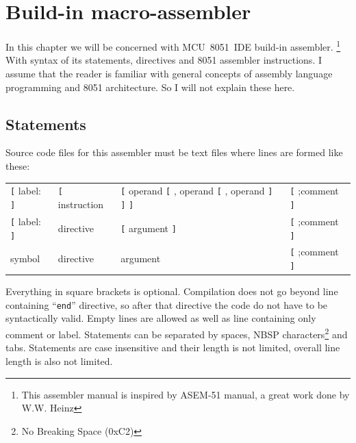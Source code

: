 \documentclass[a4paper,twoside,12pt]{book}
\newcommand{\mysmallfont}{\fontsize{8pt}{10pt} \selectfont{}}
\begin{document}
\chapter{Build-in macro-assembler}
	In this chapter we will be concerned with MCU~8051~IDE build-in assembler. \footnote{This assembler manual is inspired by ASEM-51 manual, a great work done by W.W. Heinz} With syntax of its statements, directives and 8051 assembler instructions. I assume that the reader is familiar with general concepts of assembly language programming and 8051 architecture. So I will not explain these here.

	\section{Statements}
		Source code files for this assembler must be text files where lines are formed like these:\\\bigskip
		{
			\mysmallfont{}
			\texttt{}
			\begin{tabular}[h!]{llll}
				\verb'[' { \color{highlight_label} label: } \verb']' &
				\verb'[' { \color{highlight_instruction} instruction } &
				\verb'[' { \color{highlight_symbol} operand } \verb'[' , { \color{highlight_symbol} operand } \verb'[' , { \color{highlight_symbol} operand } \verb']' \verb']' \verb']' &
				\verb'[' { \color{highlight_comment} ;comment } \verb']' \\

				\verb'[' { \color{highlight_label} label: } \verb']' &
				{ \color{highlight_directive} directive } &
				\verb'[' { \color{highlight_symbol} argument } \verb']' &
				\verb'[' { \color{highlight_comment} ;comment } \verb']' \\

				{ \color{highlight_constant} symbol } &
				{ \color{highlight_directive} directive } &
				{ \color{highlight_symbol} argument } &
				\verb'[' { \color{highlight_comment} ;comment } \verb']' \\
			\end{tabular}
		}
		\bigskip

		Everything in square brackets is optional. Compilation does not go beyond line containing ``\texttt{end}'' directive, so after that directive the code do not have to be syntactically valid. Empty lines are allowed as well as line containing only comment or label. Statements can be separated by spaces, NBSP characters\footnote{No Breaking Space (0xC2)} and tabs. Statements are case insensitive and their length is not limited, overall line length is also not limited.
\end{document}

